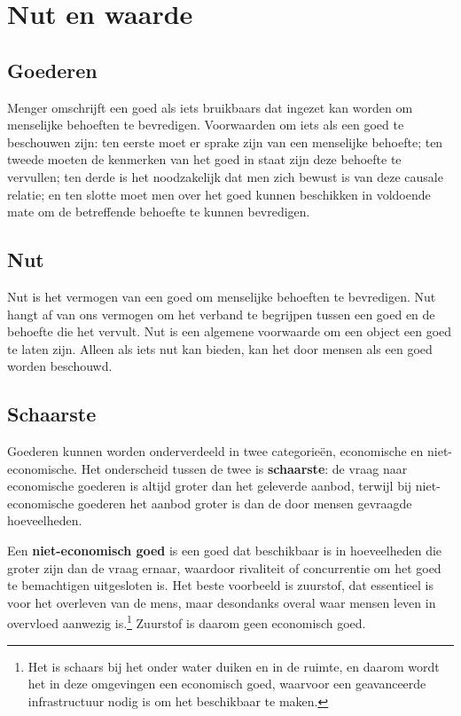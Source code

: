 \section{Nut en waarde}
\subsection{Goederen}

Menger omschrijft een goed als iets bruikbaars dat ingezet kan worden om menselijke behoeften te bevredigen. Voorwaarden om iets als een goed te beschouwen zijn: ten eerste moet er sprake zijn van een menselijke behoefte; ten tweede moeten de kenmerken van het goed in staat zijn deze behoefte te vervullen; ten derde is het noodzakelijk dat men zich bewust is van deze causale relatie; en ten slotte moet men over het goed kunnen beschikken in voldoende mate om de betreffende behoefte te kunnen bevredigen.

\subsection{Nut}

Nut is het vermogen van een goed om menselijke behoeften te bevredigen. Nut hangt af van ons vermogen om het verband te begrijpen tussen een goed en de behoefte die het vervult. Nut is een algemene voorwaarde om een object een goed te laten zijn. Alleen als iets nut kan bieden, kan het door mensen als een goed worden beschouwd.

\subsection{Schaarste}
Goederen kunnen worden onderverdeeld in twee categorieën, economische en niet-economische. Het onderscheid tussen de twee is \textbf{schaarste}: de vraag naar economische goederen is altijd groter dan het geleverde aanbod, terwijl bij niet-economische goederen het aanbod groter is dan de door mensen gevraagde hoeveelheden. 

Een \textbf{niet-economisch goed} is een goed dat beschikbaar is in hoeveelheden die groter zijn dan de vraag ernaar, waardoor rivaliteit of concurrentie om het goed te bemachtigen uitgesloten is. Het beste voorbeeld is zuurstof, dat essentieel is voor het overleven van de mens, maar desondanks overal waar mensen leven in overvloed aanwezig is.\footnote{Het is schaars bij het onder water duiken en in de ruimte, en daarom wordt het in deze omgevingen een economisch goed, waarvoor een geavanceerde infrastructuur nodig is om het beschikbaar te maken.} Zuurstof is daarom geen economisch goed.

